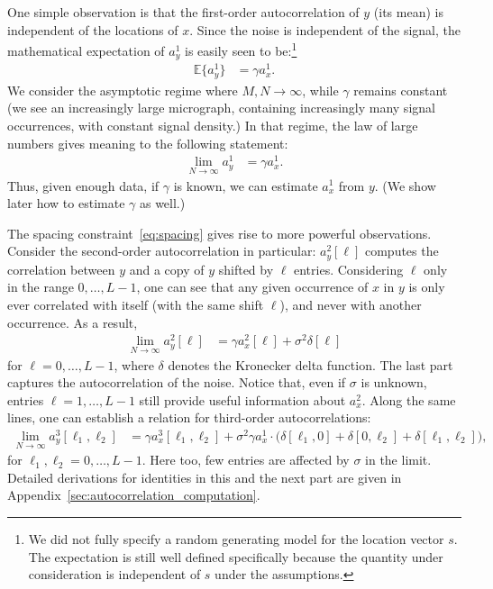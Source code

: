 \documentclass[english,11pt]{article}
\newcommand{\E}{\mathbb{E}}
\newcommand{\1}{\mathbf{1}}
\numberwithin{equation}{section}
\theoremstyle{plain}
\theoremstyle{definition}
\theoremstyle{remark}
\theoremstyle{plain}
\theoremstyle{remark}
\theoremstyle{plain}
\theoremstyle{plain}
\begin{document}
One simple observation is that the first-order autocorrelation of $y$ (its mean) is independent of the locations of $x$. Since the noise is independent of the signal, the mathematical expectation of $a_y^1$ is easily seen to be:\footnote{We did not fully specify a random generating model for the location vector $s$. The expectation is still well defined specifically because the quantity under consideration is independent of $s$ under the assumptions.}
\begin{align*}
\E\{ a_y^1 \} & = \gamma a_x^1.
\end{align*}
We consider the asymptotic regime where $M, N\to\infty$, while $\gamma$ remains constant (we see an increasingly large micrograph, containing increasingly many signal occurrences, with constant signal density.) In that regime, the law of large numbers gives meaning to the following statement:
\begin{align*}
\lim_{N\to\infty} a_y^1 & = \gamma a_{x}^1.
\end{align*}
Thus, given enough data, if $\gamma$ is known, we can estimate $a_x^1$ from $y$. (We show later how to estimate $\gamma$ as well.)

The spacing constraint~\eqref{eq:spacing} gives rise to more powerful observations. Consider the second-order autocorrelation in particular: $a_y^2[\ell]$ computes the correlation between $y$ and a copy of $y$ shifted by $\ell$ entries. Considering $\ell$ only in the range $0, \ldots, L-1$, one can see that any given occurrence of $x$ in $y$ is only ever correlated with itself (with the same shift $\ell$), and never with another occurrence. As a result,
\begin{align*}
\lim_{N\to\infty} a_y^2[\ell] & = \gamma a_{x}^2[\ell] + \sigma^2\delta[\ell]
\end{align*}
for $\ell = 0, \ldots, L-1$, where $\delta$ denotes the Kronecker delta function. The last part captures the autocorrelation of the noise. Notice that, even if $\sigma$ is unknown, entries $\ell = 1, \ldots, L-1$ still provide useful information about $a_x^2$.
Along the same lines, one can establish a relation for third-order autocorrelations:
\begin{align}
\lim_{N\to\infty} a_y^3[\ell_1,\ell_2] & = \gamma a_{x}^3[\ell_1,\ell_2] + \sigma^2\gamma a_{x}^1 \cdot \big(\delta[\ell_1,0]+\delta[0,\ell_2]+\delta[\ell_1,\ell_2]\big),
\label{eq:data_ac_k1}
\end{align}
for $\ell_1,\ell_2 = 0, \ldots, L-1$. Here too, few entries are affected by $\sigma$ in the limit.
Detailed derivations for identities in this and the next part are given in Appendix~\ref{sec:autocorrelation_computation}.
\end{document}
